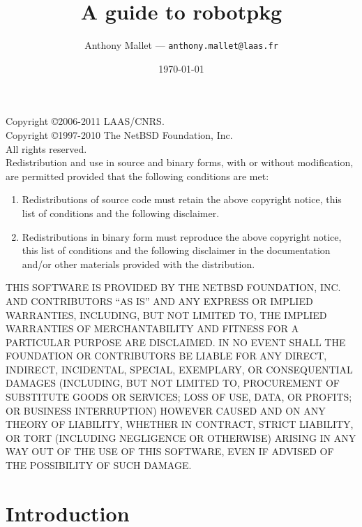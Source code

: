 \documentclass[a4paper,11pt]{book}
\title{A guide to robotpkg}
\author{Anthony Mallet --- {\tt anthony.mallet@laas.fr}}
\date{\today}
\begin{document}

\frontmatter
\maketitle

{\small\parindent0pt
Copyright \copyright 2006-2011 LAAS/CNRS.\\
Copyright \copyright 1997-2010 The NetBSD Foundation, Inc.\\
All rights reserved.\\

Redistribution and use in source and binary forms, with or without
modification, are permitted provided that the following conditions
are met:

\begin{enumerate}
\item Redistributions of source code must retain the above copyright
      notice, this list of conditions and the following disclaimer.

\item Redistributions in binary form must reproduce the above copyright
      notice, this list of conditions and the following disclaimer in the
      documentation and/or other materials provided with the distribution.
\end{enumerate}

THIS SOFTWARE IS PROVIDED BY THE NETBSD FOUNDATION, INC. AND CONTRIBUTORS
``AS IS'' AND ANY EXPRESS OR IMPLIED WARRANTIES, INCLUDING, BUT NOT LIMITED
TO, THE IMPLIED WARRANTIES OF MERCHANTABILITY AND FITNESS FOR A PARTICULAR
PURPOSE ARE DISCLAIMED.  IN NO EVENT SHALL THE FOUNDATION OR CONTRIBUTORS
BE LIABLE FOR ANY DIRECT, INDIRECT, INCIDENTAL, SPECIAL, EXEMPLARY, OR
CONSEQUENTIAL DAMAGES (INCLUDING, BUT NOT LIMITED TO, PROCUREMENT OF
SUBSTITUTE GOODS OR SERVICES; LOSS OF USE, DATA, OR PROFITS; OR BUSINESS
INTERRUPTION) HOWEVER CAUSED AND ON ANY THEORY OF LIABILITY, WHETHER IN
CONTRACT, STRICT LIABILITY, OR TORT (INCLUDING NEGLIGENCE OR OTHERWISE)
ARISING IN ANY WAY OUT OF THE USE OF THIS SOFTWARE, EVEN IF ADVISED OF THE
POSSIBILITY OF SUCH DAMAGE.
}


\tableofcontents
\mainmatter

\chapter{Introduction}
\label{chapter:introduction}

\end{document}
